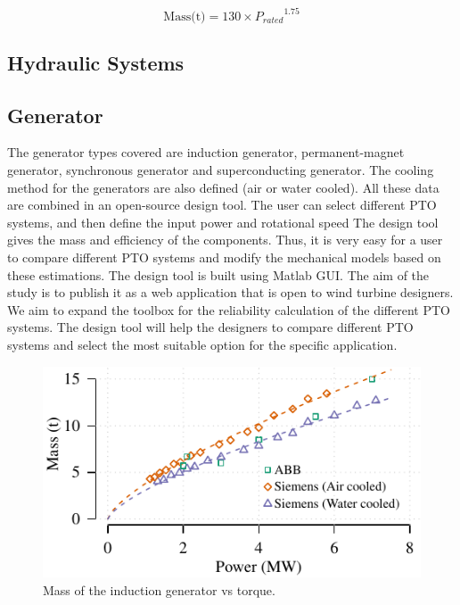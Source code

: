 \documentclass{article}\usepackage{graphicx, color}
\makeatletter
\def\maxwidth{ %
  \ifdim\Gin@nat@width>\linewidth
    \linewidth
  \else
    \Gin@nat@width
  \fi
}
\newenvironment{knitrout}{}{} %
\makeatother
\begin{document}
\begin{equation}
	\text{Mass(t)} = 130 \times {P_{rated}}^{1.75}
\end{equation}

\subsection{Hydraulic Systems}

\subsection{Generator}
The generator types covered are induction generator, permanent-magnet generator, synchronous generator and superconducting generator. The cooling method for the generators are also defined (air or water cooled). 
All these data are combined in an open-source design tool. The user can select different PTO systems, and then define the input power and rotational speed The design tool gives the mass and efficiency of the components. Thus, it is very easy for a user to compare different PTO systems and modify the mechanical models based on these estimations. The design tool is built using Matlab GUI. The aim of the study is to publish it as a web application that is open to wind turbine designers. We aim to expand the toolbox for the reliability calculation of the different PTO systems. The design tool will help the designers to compare different PTO systems and select the most suitable option for the specific application.

\begin{knitrout}
\color{fgcolor}\begin{figure}[]

\includegraphics[width=\maxwidth]{figure/induction_generator} \caption[Mass of the induction generator vs torque]{Mass of the induction generator vs torque.\label{fig:induction_generator}}
\end{figure}


\end{knitrout}
\end{document}
